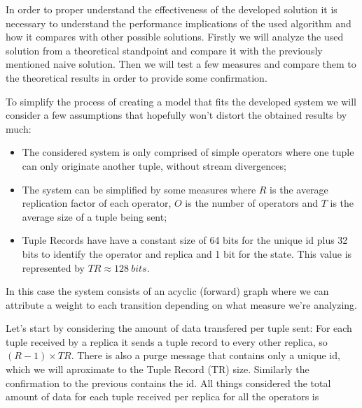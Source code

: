 \documentclass[times, 10pt,twocolumn]{article}
\begin{document}

In order to proper understand the effectiveness of the developed solution
it is necessary to understand the performance implications of the used
algorithm and how it compares with other possible solutions. Firstly we
will analyze the used solution from a theoretical standpoint and compare
it with the previously mentioned naive solution. Then we will test a few measures
and compare them to the theoretical results in order to provide some
confirmation.


To simplify the process of creating a model that fits the developed
system we will consider a few assumptions that hopefully won't distort the
obtained results by much:
\begin{itemize}
	\item The considered system is only comprised of simple operators
		where one tuple can only originate another tuple, without stream
		divergences;
	\item The system can be simplified by some measures where $R$ is the
		average replication factor of each operator, $O$ is the number of
		operators and $T$ is the average size of a tuple being sent;
	\item Tuple Records have have a constant size of 64 bits for the unique id plus
		32 bits to identify the operator and replica and 1 bit for the state.
		This value is represented by $TR \approx 128\ bits$.
\end{itemize}
In this case the system consists of an acyclic (forward) graph where we can attribute a
weight to each transition depending on what measure we're analyzing.

Let's start by considering the amount of data transfered per tuple sent:
For each tuple received by a replica it sends a tuple record to every
other replica, so $(R-1)\times TR$. There is also a purge message that
contains only a unique id, which we will aproximate to the Tuple Record
(TR) size. Similarly the confirmation to the previous contains the
id. All things considered the total amount of data for each tuple received
per replica for all the operators is 

\end{document}

